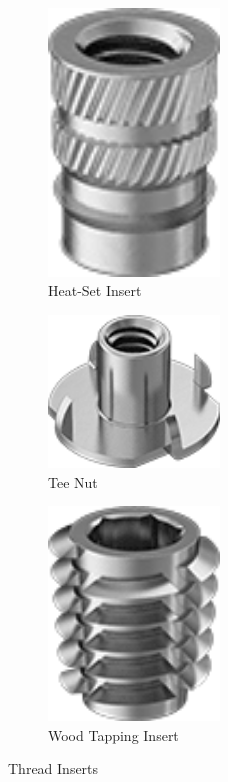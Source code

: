 \documentclass[10pt,letterpaper]{book}
\begin{document}
\begin{figure}[H]
		\begin{subfigure}[b]{.24\linewidth}
			\includegraphics[width=0.5\textwidth]{imgs/heatset.png}
			\caption{Heat-Set Insert}
		\end{subfigure}\begin{subfigure}[b]{.24\linewidth}
			\includegraphics[width=0.5\textwidth]{imgs/teenut.png}
			\caption{Tee Nut}
		\end{subfigure}\begin{subfigure}[b]{.24\linewidth}
			\includegraphics[width=0.5\textwidth]{imgs/woodsti.png}
			\caption{Wood Tapping Insert}
		\end{subfigure}
		\caption{Thread Inserts}
	\end{figure}
	
\end{document}
